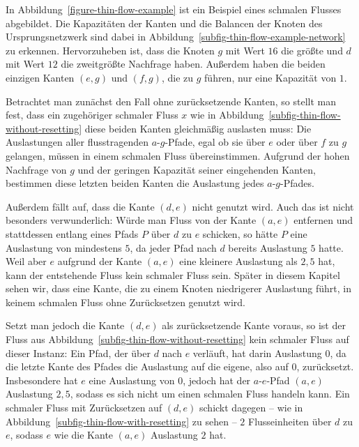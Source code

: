 \begin{example}
	In Abbildung~\ref{figure-thin-flow-example} ist ein Beispiel eines schmalen Flusses abgebildet.
	Die Kapazitäten der Kanten und die Balancen der Knoten des Ursprungsnetzwerk sind dabei in Abbildung~\ref{subfig-thin-flow-example-network} zu erkennen.
	Hervorzuheben ist, dass die Knoten $g$ mit Wert $16$ die größte und $d$ mit Wert $12$ die zweitgrößte Nachfrage haben.
	Außerdem haben die beiden einzigen Kanten $(e,g)$ und $(f,g)$, die zu $g$ führen, nur eine Kapazität von $1$.
	
	Betrachtet man zunächst den Fall ohne zurücksetzende Kanten, so stellt man fest, dass ein zugehöriger schmaler Fluss $x$ wie in Abbildung~\ref{subfig-thin-flow-without-resetting} diese beiden Kanten gleichmäßig auslasten muss:
	Die Auslastungen aller flusstragenden $a$-$g$-Pfade, egal ob sie über $e$ oder über $f$ zu $g$ gelangen, müssen in einem schmalen Fluss übereinstimmen.
	Aufgrund der hohen Nachfrage von $g$ und der geringen Kapazität seiner eingehenden Kanten, bestimmen diese letzten beiden Kanten die Auslastung jedes $a$-$g$-Pfades.
	
	Außerdem fällt auf, dass die Kante $(d,e)$ nicht genutzt wird.
	Auch das ist nicht besonders verwunderlich:
	Würde man Fluss von der Kante $(a, e)$ entfernen und stattdessen entlang eines Pfads $P$ über $d$ zu $e$ schicken, so hätte $P$ eine Auslastung von mindestens $5$, da jeder Pfad nach $d$ bereits Auslastung $5$ hatte.
	Weil aber $e$ aufgrund der Kante $(a,e)$ eine kleinere Auslastung als $2{,}5$ hat, kann der entstehende Fluss kein schmaler Fluss sein.
	Später in diesem Kapitel sehen wir, dass eine Kante, die zu einem Knoten niedrigerer Auslastung führt, in keinem schmalen Fluss ohne Zurücksetzen genutzt wird.
	
	Setzt man jedoch die Kante $(d, e)$ als zurücksetzende Kante voraus, so ist der Fluss aus Abbildung~\ref{subfig-thin-flow-without-resetting} kein schmaler Fluss auf dieser Instanz:
	Ein Pfad, der über $d$ nach $e$ verläuft, hat darin Auslastung $0$, da die letzte Kante des Pfades die Auslastung auf die eigene, also auf $0$, zurücksetzt.
	Insbesondere hat $e$ eine Auslastung von $0$, jedoch hat der $a$-$e$-Pfad $(a, e)$ Auslastung $2{,}5$, sodass es sich nicht um einen schmalen Fluss handeln kann.
	Ein schmaler Fluss mit Zurücksetzen auf $(d, e)$ schickt dagegen -- wie in Abbildung~\ref{subfig-thin-flow-with-resetting} zu sehen -- $2$ Flusseinheiten über $d$ zu $e$, sodass $e$ wie die Kante $(a,e)$ Auslastung $2$ hat.
\end{example}

